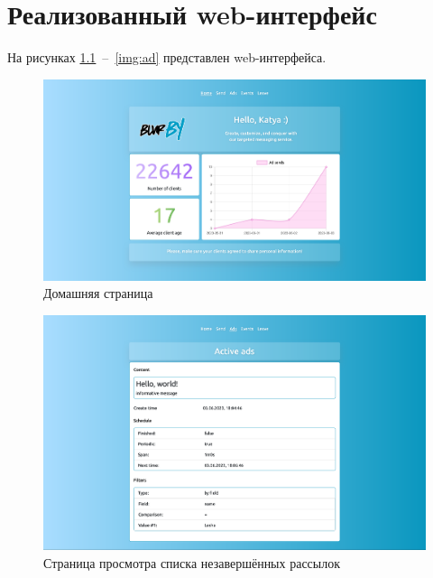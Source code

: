 \begin{appendices}
\label{appendix:graph}
	\chapter{Реализованный web-интерфейс}
	
	На рисунках \ref{img:home}~--~\ref{img:ad} представлен web-интерфейса.
	
\begin{figure}[h!]
	\centering
    \includegraphics[width=\linewidth]{./images/home.png}
    \caption{Домашняя страница}
    \label{img:home}
\end{figure}

\begin{figure}[h!]
	\centering
    \includegraphics[width=\linewidth]{./images/ads.png}
    \caption{Страница просмотра списка незавершённых рассылок}
    \label{img:ads}
\end{figure}

\newpage


\end{appendices}
